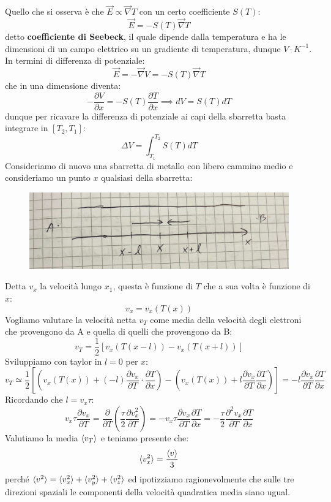 \documentclass{book}
\begin{document}
            Quello che si osserva è che $\vec{E} \propto \vec{\nabla} T$ con un certo coefficiente $S(T)$:
            $$\vec{E} = - S(T)\vec{\nabla}T$$
            detto \textbf{coefficiente di Seebeck}, il quale dipende dalla temperatura e ha le dimensioni di un campo elettrico su un gradiente di temperatura, dunque $V \cdot K^{-1}$.
            In termini di differenza di potenziale:
            $$\vec{E} =- \vec{\nabla}V = -S(T) \vec{\nabla}T$$
            che in una dimensione diventa:
            $$- \frac{\partial V}{\partial x} = - S(T) \frac{\partial T}{\partial x} \implies dV = S(T)dT$$
            dunque per ricavare la differenza di potenziale ai capi della sbarretta basta integrare in $[T_{2},T_{1}]$:
            $$\Delta V = \int_{T_{1}} ^{T_{2}} S(T)dT$$
            Consideriamo di nuovo una sbarretta di metallo con libero cammino medio e consideriamo un punto $x$ qualsiasi della sbarretta:
            \begin{figure}[h!]
                \centering
                \includegraphics[width=0.5\linewidth]{img/sbarrettapt2.png}
            \end{figure}
            Detta $v_{x}$ la velocità lungo $x_{1}$, questa è funzione di $T$ che a sua volta è funzione di $x$:
            $$v_{x} = v_{x}(T(x))$$
            Vogliamo valutare la velocità netta $v_{T}$ come media della velocità degli elettroni che provengono da A e quella di quelli che provengono da B:
            $$v_{T} = \frac{1}{2} [v_{x}(T(x-l))-v_{x}(T(x+l))]$$
            Sviluppiamo con taylor in $l=0$ per $x$:
            $$v_{T} \simeq \frac{1}{2} [(v_{x}(T(x))+(-l)\frac{\partial v_{x}}{\partial T} \cdot \frac{\partial T}{\partial x})-(v_{x}(T(x))+l \frac{\partial v_{x}}{\partial T} \frac{\partial T}{\partial x})] = -l \frac{\partial v_{x}}{\partial T} \frac{\partial T}{\partial x}$$
            Ricordando che $l=v_{x}\tau$:
            $$\displaystyle v_{x}\tau \frac{\partial v_{x}}{\partial T} = \frac{\partial}{\partial T} (\frac{\tau}{2}\frac{\partial v_{x} ^{2}}{\partial T}) = -v_{x}\tau \frac{\partial v_{x}}{\partial T} \frac{\partial T}{\partial x} = -\frac{\tau}{2} \frac{\partial ^{2}v_{x}}{\partial T} \frac{\partial T}{\partial x}$$
            Valutiamo la media $\braket{v_{T}}$ e teniamo presente che:
            $$\braket{v_{x} ^{2}} = \frac{\braket{v}}{3}$$ perché $\braket{v^{2}} = \braket{v_{x}^{2}}+\braket{v_{y}^{2}}+\braket{v_{z} ^{2}}$ ed ipotizziamo ragionevolmente che sulle tre direzioni spaziali le componenti della velocità quadratica media siano ugual.
\end{document}
